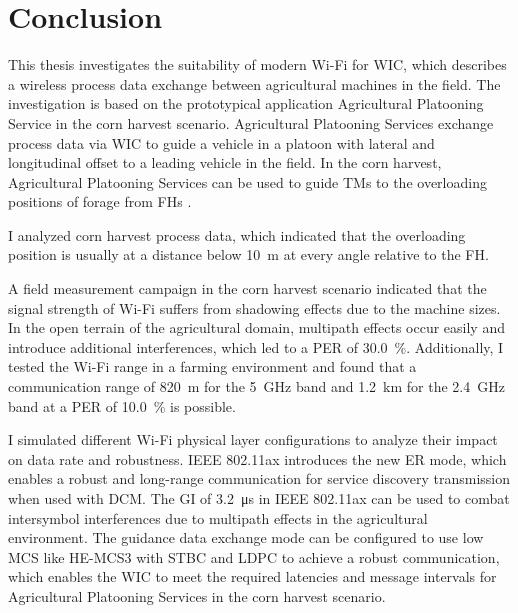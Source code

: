 \chapter{Conclusion}
\acresetall
\begin{comment}
    \begin{itemize}
    \item summarize again what your paper did, but now emphasize more the results, and comparisons
    \item write conclusions that can be drawn from the results found and the discussion presented in the paper
    \item future work (be very brief, explain what, but not much how, do not speculate about results or impact)
    \item recommended length: one page.
    \end{itemize}
\end{comment}

This thesis investigates the suitability of modern Wi-Fi for \ac{WIC}, which describes a wireless process data exchange between agricultural machines in the field.
The investigation is based on the prototypical application Agricultural Platooning Service in the corn harvest scenario.
Agricultural Platooning Services exchange process data via \ac{WIC} to guide a vehicle in a platoon with lateral and longitudinal
offset to a leading vehicle in the field.
In the corn harvest, Agricultural Platooning Services can be used to guide \ac{TM}s to the overloading positions of forage from \ac{FH}s .

I analyzed corn harvest process data, which indicated that the overloading position is usually at a distance below \SI{10}{\metre} at every angle relative to the \ac{FH}.

A field measurement campaign in the corn harvest scenario indicated that the signal strength of Wi-Fi suffers from shadowing effects due to the machine sizes.
In the open terrain of the agricultural domain, multipath effects occur easily and introduce additional interferences, which led to a \ac{PER} of \SI{30.0}{\percent}.
Additionally, I tested the Wi-Fi range in a farming environment and found that a communication range of \SI{820}{\meter}
for the \SI{5}{\giga\hertz} band and \SI{1.2}{\kilo\meter} for the \SI{2.4}{\giga\hertz} band
at a \ac{PER} of \SI{10.0}{\percent} is possible. 

I simulated different Wi-Fi physical layer configurations to analyze their impact on data rate and robustness.
IEEE 802.11ax introduces the new \ac{ER} mode, which enables a robust and long-range communication for service discovery transmission when used with \ac{DCM}.
The \ac{GI} of \SI{3.2}{\micro\second} in IEEE 802.11ax can be used to combat intersymbol interferences due to multipath effects in the agricultural environment.
The guidance data exchange mode can be configured to use low \ac{MCS} like \ac{HE}-\ac{MCS}3 with \ac{STBC} and \ac{LDPC} to achieve a robust communication,
which enables the \ac{WIC} to meet the required latencies and message intervals for Agricultural Platooning Services in the corn harvest scenario.

